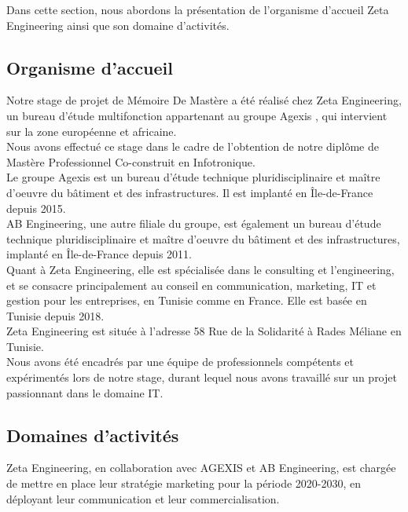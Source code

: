Dans cette section, nous abordons la présentation de l'organisme d'accueil Zeta Engineering ainsi que son domaine d'activités.

\subsection{Organisme d'accueil}


Notre stage de projet de Mémoire De Mastère a été réalisé chez Zeta Engineering, un bureau d'étude multifonction appartenant au groupe Agexis \cite{agexis}, qui intervient sur la zone européenne et africaine. \\

Nous avons effectué ce stage dans le cadre de l'obtention de notre diplôme de Mastère Professionnel Co-construit en Infotronique. \\

Le groupe Agexis est un bureau d'étude technique pluridisciplinaire et maître d'oeuvre du bâtiment et des infrastructures. Il est implanté en Île-de-France depuis 2015.  \\


AB Engineering, une autre filiale du groupe, est également un bureau d'étude technique pluridisciplinaire et maître d'oeuvre du bâtiment et des infrastructures, implanté en Île-de-France depuis 2011. \\


Quant à Zeta Engineering, elle est spécialisée dans le consulting et l'engineering, et se consacre principalement au conseil en communication, marketing, IT et gestion pour les entreprises, en Tunisie comme en France. Elle est basée en Tunisie depuis 2018. \\


Zeta Engineering est située à l'adresse 58 Rue de la Solidarité à Rades Méliane en Tunisie. \\


Nous avons été encadrés par une équipe de professionnels compétents et expérimentés lors de notre stage, durant lequel nous avons travaillé sur un projet passionnant dans le domaine IT. \\





\subsection{Domaines d'activités}
Zeta Engineering, en collaboration avec AGEXIS et AB Engineering, est chargée de mettre en place leur stratégie marketing pour la période 2020-2030, en déployant leur communication et leur commercialisation. \\


